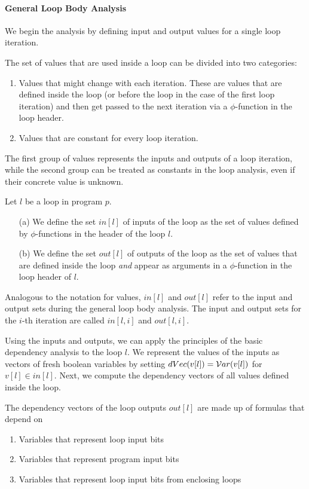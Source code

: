 \paragraph{General Loop Body Analysis}
We begin the analysis by defining input and output values for a single loop iteration. 

The set of values that are used inside a loop can be divided into two categories:
\begin{enumerate}
    \item Values that might change with each iteration. These are values that are defined inside the loop (or before the loop in the case of the first loop iteration) and then get passed to the next iteration via a $\phi$-function in the loop header.
    \item Values that are constant for every loop iteration.
\end{enumerate}

The first group of values represents the inputs and outputs of a loop iteration, while the second group can be treated as constants in the loop analysis, even if their concrete value is unknown.

\begin{definition}
    Let $l$ be a loop in program $p$.
    \begin{itemize}
        \item[(a)] We define the set $in[l]$ of inputs of the loop as the set of values defined by $\phi$-functions in the header of the loop $l$.
        \item[(b)] We define the set $out[l]$ of outputs of the loop as the set of values that are defined inside the loop \emph{and} appear as arguments in a $\phi$-function in the loop header of $l$.
    \end{itemize}
\end{definition}

Analogous to the notation for values, $in[l]$ and $out[l]$ refer to the input and output sets during the general loop body analysis. The input and output sets for the $i$-th iteration are called $in[l, i]$ and $out[l, i]$.

Using the inputs and outputs, we can apply the principles of the basic dependency analysis to the loop $l$. We represent the values of the inputs as vectors of fresh boolean variables by setting $dVec(v[l]) = \mathcal{V}ar(v[l])$ for $v[l] \in in[l]$. Next, we compute the dependency vectors of all values defined inside the loop. 

The dependency vectors of the loop outputs $out[l]$ are made up of formulas that depend on
\begin{enumerate}
    \setlength\itemsep{0em}
    \item Variables that represent loop input bits
    \item Variables that represent program input bits
    \item Variables that represent loop input bits from enclosing loops
\end{enumerate}

